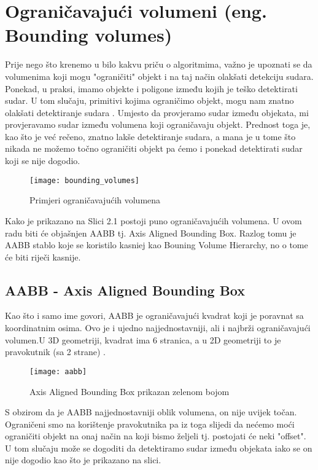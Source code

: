 \chapter {Ograničavajući volumeni (eng. Bounding volumes)}

Prije nego što krenemo u bilo kakvu priču o algoritmima, važno je upoznati se da volumenima koji mogu "ograničiti" objekt i na taj način olakšati detekciju sudara. Ponekad, u praksi, imamo objekte i poligone između kojih je teško detektirati sudar. U tom slučaju, primitivi kojima ograničimo objekt, mogu nam znatno olakšati detektiranje sudara \cite{1}. Umjesto da provjeramo sudar između objekata, mi provjeravamo sudar između volumena koji ograničavaju objekt. Prednost toga je, kao što je već rečeno, znatno lakše detektiranje sudara, a mana je u tome što nikada ne možemo točno ograničiti objekt pa ćemo i ponekad detektirati sudar koji se nije dogodio.
\begin{figure}[!http]
	\begin{center}
		\texttt{[image: bounding\_volumes]}
		\caption{Primjeri ograničavajućih volumena}
		\label{fig:1}
	\end{center}
\end{figure}

Kako je prikazano na Slici 2.1 postoji puno ograničavajućih volumena\cite{1}. U ovom radu biti će objašnjen AABB tj. Axis Aligned Bounding Box. Razlog tomu je AABB stablo koje se koristilo kasniej kao Bouning Volume Hierarchy, no o tome će biti riječi kasnije.

\section{AABB - Axis Aligned Bounding Box}

Kao što i samo ime govori, AABB je ograničavajući kvadrat koji je poravnat sa koordinatnim osima. Ovo je i ujedno najjednostavniji, ali i najbrži ograničavajući volumen\cite{1}.U 3D geometriji, kvadrat ima 6 stranica, a u 2D geometriji to je pravokutnik (sa 2 strane) \cite{1}. 
\begin{figure}[!http]
	\begin{center}
		\texttt{[image: aabb]}
		\caption{Axis Aligned Bounding Box prikazan zelenom bojom}
		\label{fig:2}
	\end{center}
\end{figure}

S obzirom da je AABB najjednostavniji oblik volumena, on nije uvijek točan. Ograničeni smo na korištenje pravokutnika pa iz toga slijedi da nećemo moći ograničiti objekt na onaj način na koji bismo željeli tj. postojati će neki "offset". U tom slučaju može se dogoditi da detektiramo sudar između objekata iako se on nije dogodio kao što je prikazano na slici.


